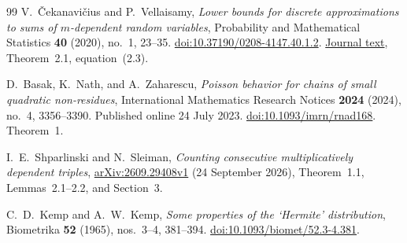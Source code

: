 \begin{thebibliography}{99}
V.~\v{C}ekanavi\v{c}ius and P.~Vellaisamy,
\emph{Lower bounds for discrete approximations to sums of
$m$-dependent random variables},
Probability and Mathematical Statistics \textbf{40} (2020),
no.~1, 23--35.
\href{https://doi.org/10.37190/0208-4147.40.1.2}
{doi:10.37190/0208-4147.40.1.2}.
\href{https://www.math.uni.wroc.pl/~pms/files_doi/f1648/f1648.pdf}
{Journal text}, Theorem~2.1, equation~(2.3).

D.~Basak, K.~Nath, and A.~Zaharescu,
\emph{Poisson behavior for chains of small quadratic non-residues},
International Mathematics Research Notices \textbf{2024} (2024),
no.~4, 3356--3390. Published online 24 July 2023.
\href{https://doi.org/10.1093/imrn/rnad168}
{doi:10.1093/imrn/rnad168}. Theorem~1.

I.~E.~Shparlinski and N.~Sleiman,
\emph{Counting consecutive multiplicatively dependent triples},
\href{https://arxiv.org/abs/2609.29408v1}
{arXiv:2609.29408v1} (24 September 2026),
Theorem~1.1, Lemmas~2.1--2.2, and Section~3.

C.~D.~Kemp and A.~W.~Kemp,
\emph{Some properties of the `Hermite' distribution},
Biometrika \textbf{52} (1965), nos.~3--4, 381--394.
\href{https://doi.org/10.1093/biomet/52.3-4.381}
{doi:10.1093/biomet/52.3-4.381}.

\end{thebibliography}
